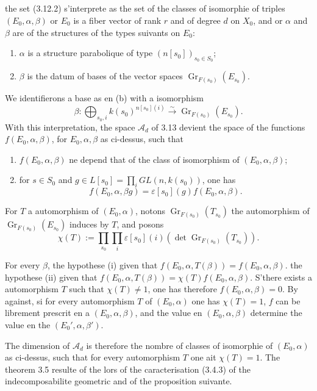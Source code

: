 \documentclass[11pt,a4paper]{article}
\theoremstyle{plain}
\theoremstyle{definition}
\DeclareMathOperator{\Gri}{Gr}
\begin{document}
\subsection{}
the set (3.12.2) s'interprete as the set of the classes of isomorphie of triples $(E_0, \alpha, \beta)$ or $E_0$ is a fiber vector of rank $r$ and of degree $d$ on $X_0$, and or $\alpha$ and $\beta$ are of the structures of the types suivants on $E_0$:
\begin{enumerate}[label=(\alph*)]
\item $\alpha$ is a structure parabolique of type $(n[s_0])_{s_0 \in S_0}$;
\item $\beta$ is the datum of bases of the vector spaces $\Gri_{F(s_0)}(E_{s_0})$.
\end{enumerate}
We identifierons a base as en (b) with a isomorphism
\[
\beta: \bigoplus_{s_0, i} k(s_0)^{n[s_0](i)} \xrightarrow{\sim} \Gri_{F(s_0)}(E_{s_0}).
\]
With this interpretation, the space $\mathcal{A}_d$ of 3.13 devient the space of the functions $f(E_0, \alpha, \beta)$, for $E_0, \alpha, \beta$ as ci-dessus, such that
\begin{enumerate}[label=(\roman*)]
\item $f(E_0, \alpha, \beta)$ ne depend that of the class of isomorphism of $(E_0, \alpha, \beta)$;
\item for $s \in S_0$ and $g \in L[s_0] = \prod_i GL(n, k(s_0))$, one has
\[
f(E_0, \alpha, \beta g) = \varepsilon[s_0](g) f(E_0, \alpha, \beta).
\]
\end{enumerate}

For $T$ a automorphism of $(E_0, \alpha)$, notons $\Gri_{F(s_0)}(T_{s_0})$ the automorphism of $\Gri_{F(s_0)}(E_{s_0})$ induces by $T$, and posons
\begin{equation}
\chi(T) := \prod_{s_0} \prod_i \varepsilon[s_0](i)(\det \Gri_{F(s_0)}(T_{s_0})).
\tag{3.14.1}
\end{equation}

For every $\beta$, the hypothese (i) given that $f(E_0, \alpha, T(\beta)) = f(E_0, \alpha, \beta)$. the hypothese (ii) given that $f(E_0, \alpha, T(\beta)) = \chi(T) f(E_0, \alpha, \beta)$. S'there exists a automorphism $T$ such that $\chi(T) \neq 1$, one has therefore $f(E_0, \alpha, \beta) = 0$. By against, si for every automorphism $T$ of $(E_0, \alpha)$ one has $\chi(T) = 1$, $f$ can be librement prescrit en a $(E_0, \alpha, \beta)$, and the value en $(E_0, \alpha, \beta)$ determine the value en the $(E_0', \alpha, \beta')$.

The dimension of $\mathcal{A}_d$ is therefore the nombre of classes of isomorphie of $(E_0, \alpha)$ as ci-dessus, such that for every automorphism $T$ one ait $\chi(T) = 1$. The theorem 3.5 resulte of the lors of the caracterisation (3.4.3) of the indecomposabilite geometric and of the proposition suivante.
\end{document}
